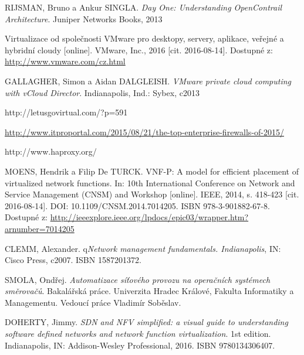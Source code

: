 \begin{thebibliography}{10}
 RIJSMAN, Bruno a Ankur SINGLA. \emph{Day One: Understanding OpenContrail Architecture}. Juniper Networks Books, 2013

 Virtualizace od společnosti VMware pro desktopy, servery, aplikace, veřejné a hybridní cloudy [online]. VMware, Inc., 2016 [cit. 2016-08-14]. Dostupné z: \url{http://www.vmware.com/cz.html}

GALLAGHER, Simon a Aidan DALGLEISH. \emph{VMware private cloud computing with vCloud Director}. Indianapolis, Ind.: Sybex, c2013

 http://letusgovirtual.com/?p=591

 \url{http://www.itproportal.com/2015/08/21/the-top-enterprise-firewalls-of-2015/}





 http://www.haproxy.org/


MOENS, Hendrik a Filip De TURCK. VNF-P: A model for efficient placement of virtualized network functions. In: 10th International Conference on Network and Service Management (CNSM) and Workshop [online]. IEEE, 2014, s. 418-423 [cit. 2016-08-14]. DOI: 10.1109/CNSM.2014.7014205. ISBN 978-3-901882-67-8. Dostupné z: \url{http://ieeexplore.ieee.org/lpdocs/epic03/wrapper.htm?arnumber=7014205}

 CLEMM, Alexander. q\emph{Network management fundamentals. Indianapolis}, IN: Cisco Press, c2007. ISBN 1587201372.

 SMOLA, Ondřej. \emph{Automatizace síťového provozu na operačních systémech směrovačů}. Bakalářská práce. Univerzita Hradec Králové, Fakulta Informatiky a Managementu. Vedoucí práce Vladimír Soběslav. 






 DOHERTY, Jimmy. \emph{SDN and NFV simplified: a visual guide to understanding software defined networks and network function virtualization}. 1st edition. Indianapolis, IN: Addison-Wesley Professional, 2016. ISBN 9780134306407.




\end{thebibliography}
